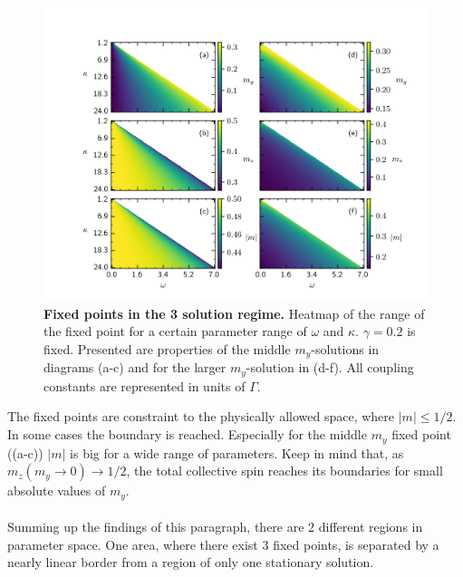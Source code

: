 \begin{figure}[H]
    \vspace*{-0.4cm}
    \hspace*{-1cm}
    \includegraphics{pictures/fixp_bound_heatmap_ml2.png}
    \caption{\textbf{Fixed points in the 3 solution regime.} Heatmap of the range of the fixed point for a certain parameter range of $\omega$ and $\kappa$. $\gamma=0.2$ is fixed. Presented are properties of the middle $m_y$-solutions in diagrams (a-c) and for the larger $m_y$-solution in (d-f). All coupling constants are represented in units of $\Gamma$.}
    \label{fig:fixp_midlarge_bound_hm}
\end{figure}
The fixed points are constraint to the physically allowed space, where $|m|\leq1/2$. In some cases the boundary is reached. Especially for the middle $m_y$ fixed point ((a-c)) $|m|$ is big for a wide range of parameters. Keep in mind that, as $m_z(m_y\rightarrow0)\rightarrow1/2$, the total collective spin reaches its boundaries for small absolute values of $m_y$.\\\\
Summing up the findings of this paragraph, there are 2 different regions in parameter space. One area, where there exist 3 fixed points, is separated by a nearly linear border from a region of only one stationary solution.


